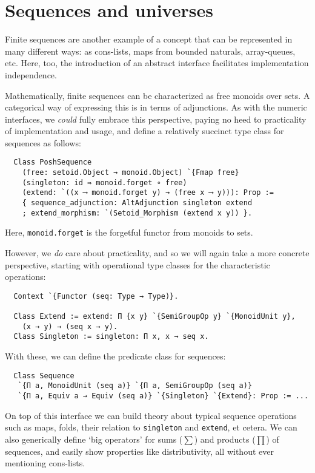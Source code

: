 \documentclass[a4paper,10pt,runningheads]{llncs}
\begin{document}
\section{Sequences and universes}\label{sequences}

Finite sequences are another example of a concept that can be represented in many different ways: as cons-lists, maps from bounded naturals, array-queues, etc. Here, too, the introduction of an abstract interface facilitates implementation independence.

Mathematically, finite sequences can be characterized as free monoids over sets. A categorical way of expressing this is in terms of adjunctions. As with the numeric interfaces, we \emph{could} fully embrace this perspective, paying no heed to practicality of implementation and usage, and define a relatively succinct type class for sequences as follows:
\begin{lstlisting}
  Class PoshSequence
    (free: setoid.Object → monoid.Object) `{Fmap free}
    (singleton: id ⇛ monoid.forget ∘ free)
    (extend: `((x ⟶ monoid.forget y) → (free x ⟶ y))): Prop :=
    { sequence_adjunction: AltAdjunction singleton extend
    ; extend_morphism: `(Setoid_Morphism (extend x y)) }.
\end{lstlisting}
Here, \lstinline|monoid.forget| is the forgetful functor from monoids to sets.

However, we \emph{do} care about practicality, and so we will again take a more concrete perspective, starting with operational type classes for the characteristic operations:
\begin{lstlisting}
  Context `{Functor (seq: Type → Type)}.

  Class Extend := extend: Π {x y} `{SemiGroupOp y} `{MonoidUnit y},
    (x → y) → (seq x → y).
  Class Singleton := singleton: Π x, x → seq x.
\end{lstlisting}
With these, we can define the predicate class for sequences:
\begin{lstlisting}
  Class Sequence
   `{Π a, MonoidUnit (seq a)} `{Π a, SemiGroupOp (seq a)}
   `{Π a, Equiv a → Equiv (seq a)} `{Singleton} `{Extend}: Prop := ...
\end{lstlisting}
On top of this interface we can build theory about typical sequence operations such as maps, folds, their relation to \lstinline|singleton| and \lstinline|extend|, et cetera. We can also generically define `big operators' for sums ($\sum$) and products ($\prod$) of sequences, and easily show properties like distributivity, all without ever mentioning cons-lists.
\end{document}
